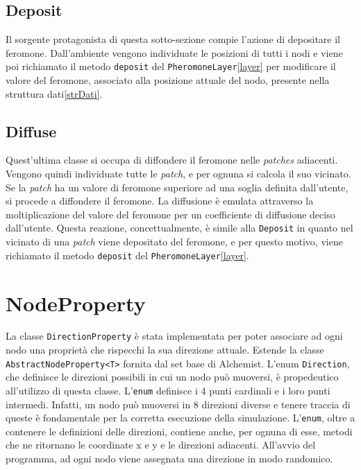 \subsection{Deposit}
Il sorgente protagonista di questa sotto-sezione compie l'azione di depositare il feromone. Dall'ambiente
vengono individuate le posizioni di tutti i nodi e viene poi richiamato il metodo \texttt{deposit} del \texttt{PheromoneLayer}\space\ref{layer}
per modificare il valore del feromone, associato alla posizione attuale del nodo, presente nella struttura dati\space\ref{strDati}.\newline


\subsection{Diffuse}
Quest'ultima classe si occupa di diffondere il feromone nelle \textit{patches} adiacenti. Vengono quindi individuate tutte
le \textit{patch}, e per ognuna si calcola il suo vicinato. Se la \textit{patch} ha un valore di feromone superiore ad una soglia definita dall'utente,
si procede a diffondere il feromone. La diffusione è emulata attraverso la moltiplicazione del valore del feromone
per un coefficiente di diffusione deciso dall'utente. Questa reazione, concettualmente, è simile alla \texttt{Deposit} in quanto
nel vicinato di una \textit{patch} viene depositato del feromone, e per questo motivo, viene richiamato il metodo \texttt{deposit} del \texttt{PheromoneLayer}\space\ref{layer}.
\newline


\section{NodeProperty}
La classe \texttt{DirectionProperty} è stata implementata per poter associare ad ogni nodo una proprietà che rispecchi la sua direzione attuale.
Estende la classe \texttt{AbstractNodeProperty<T>} fornita dal set base di Alchemist.
L'enum \texttt{Direction}, che definisce le direzioni possibili in cui un nodo può muoversi, è propedeutico all'utilizzo di questa classe.
L'\texttt{enum} definisce i 4 punti cardinali e i loro punti intermedi. Infatti, un nodo può muoversi in 8 direzioni diverse e tenere traccia di
queste è fondamentale per la corretta esecuzione della simulazione. L'\texttt{enum}, oltre a contenere le definizioni delle direzioni, contiene anche,
per ognuna di esse, metodi che ne ritornano le coordinate x e y e le direzioni adiacenti. All'avvio del programma, ad ogni nodo 
viene assegnata una direzione in modo randomico. 

